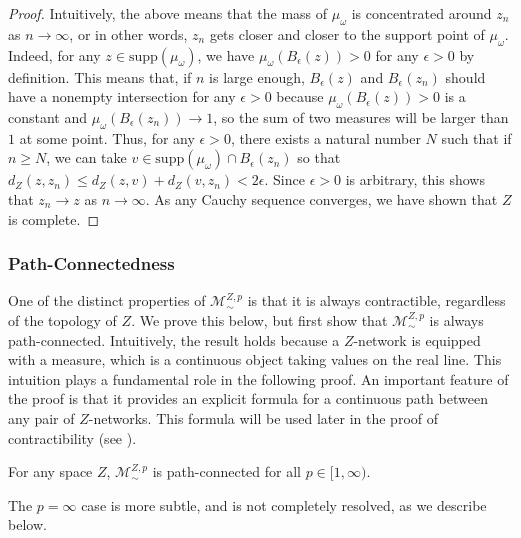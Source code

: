 \documentclass[twoside,11pt]{article}
\theoremstyle{definition}
\newcommand{\M}{\mathcal{M}}
\newcommand{\MZp}{\M_{\sim}^{Z,p}}
\begin{document}
\begin{proof}
    Intuitively, the above means that the mass of $\mu_{\omega}$ is concentrated around $z_n$ as $n\to \infty$, or in other words, $z_n$ gets closer and closer to the support point of $\mu_{\omega}$. Indeed, for any $z\in \textrm{supp}(\mu_{\omega})$, we have $\mu_{\omega}(B_{\epsilon}(z))>0$ for any $\epsilon>0$ by definition. This means that, if $n$ is large enough, $B_{\epsilon}(z)$ and $B_{\epsilon}(z_n)$ should have a nonempty intersection for any $\epsilon>0$ because $\mu_{\omega}(B_{\epsilon}(z))>0$ is a constant and $\mu_{\omega}(B_{\epsilon}(z_n))\to 1$, so the sum of two measures will be larger than $1$ at some point. Thus, for any $\epsilon>0$, there exists a natural number $N$ such that if $n\geq N$, we can take $v\in \textrm{supp}(\mu_{\omega})\cap B_{\epsilon}(z_n)$ so that $d_Z(z,z_n)\leq d_Z(z,v)+d_Z(v,z_n)<2\epsilon$. Since $\epsilon>0$ is arbitrary, this shows that $z_n\to z$ as $n\to \infty$. As any Cauchy sequence converges, we have shown that $Z$ is complete.
\end{proof}


\subsubsection{Path-Connectedness}

One of the distinct properties of $\MZp$ is that it is always contractible, regardless of the topology of $Z$. We prove this below, but first show that $\MZp$ is always path-connected. Intuitively, the result holds because a $Z$-network is equipped with a measure, which is a continuous object taking values on the real line. This intuition plays a fundamental role in the following proof. An important feature of the proof is that it provides an explicit formula for a continuous path between any pair of $Z$-networks. This formula will be used later in the proof of contractibility (see ).

\begin{proposition}
    \label{prop:path-connected}
    For any space $Z$, $\MZp$ is path-connected for all $p\in[1,\infty)$.
\end{proposition}

The $p=\infty$ case is more subtle, and is not completely resolved, as we describe below.
\end{document}
